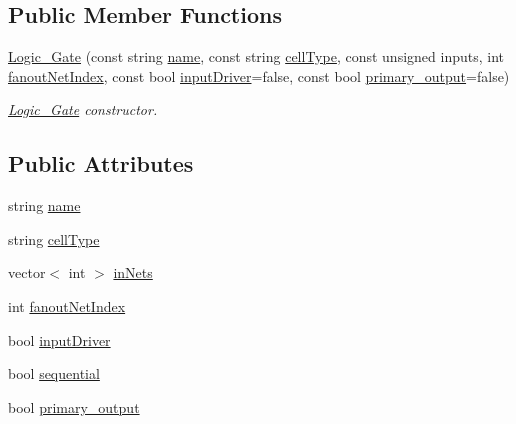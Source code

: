 \subsection*{Public Member Functions}
\begin{DoxyCompactItemize}
\item 
\hyperlink{structCircuit__Netlist_1_1Logic__Gate_a81569a5c27c575b1725c5da2c2090f54}{Logic\-\_\-\-Gate} (const string \hyperlink{structCircuit__Netlist_1_1Logic__Gate_aa780fa4baf5244fcf34c52053005f73a}{name}, const string \hyperlink{structCircuit__Netlist_1_1Logic__Gate_a3b48b229126233bf5a98f39b003e7e5a}{cell\-Type}, const unsigned inputs, int \hyperlink{structCircuit__Netlist_1_1Logic__Gate_ac77535e3e3fff92529fa21d711cd0487}{fanout\-Net\-Index}, const bool \hyperlink{structCircuit__Netlist_1_1Logic__Gate_ad08611514342cd0293640fac9eebc61a}{input\-Driver}=false, const bool \hyperlink{structCircuit__Netlist_1_1Logic__Gate_a475c5b2598538600935f66be43c163fa}{primary\-\_\-output}=false)
\begin{DoxyCompactList}\small\item\em \hyperlink{structCircuit__Netlist_1_1Logic__Gate}{Logic\-\_\-\-Gate} constructor. \end{DoxyCompactList}\end{DoxyCompactItemize}
\subsection*{Public Attributes}
\begin{DoxyCompactItemize}
\item 
string \hyperlink{structCircuit__Netlist_1_1Logic__Gate_aa780fa4baf5244fcf34c52053005f73a}{name}
\item 
string \hyperlink{structCircuit__Netlist_1_1Logic__Gate_a3b48b229126233bf5a98f39b003e7e5a}{cell\-Type}
\item 
vector$<$ int $>$ \hyperlink{structCircuit__Netlist_1_1Logic__Gate_a0ada4f530d1846973daed17e35eb10a7}{in\-Nets}
\item 
int \hyperlink{structCircuit__Netlist_1_1Logic__Gate_ac77535e3e3fff92529fa21d711cd0487}{fanout\-Net\-Index}
\item 
bool \hyperlink{structCircuit__Netlist_1_1Logic__Gate_ad08611514342cd0293640fac9eebc61a}{input\-Driver}
\item 
bool \hyperlink{structCircuit__Netlist_1_1Logic__Gate_a3919c593d1a40b4467d6735be783eee6}{sequential}
\item 
bool \hyperlink{structCircuit__Netlist_1_1Logic__Gate_a475c5b2598538600935f66be43c163fa}{primary\-\_\-output}
\end{DoxyCompactItemize}


